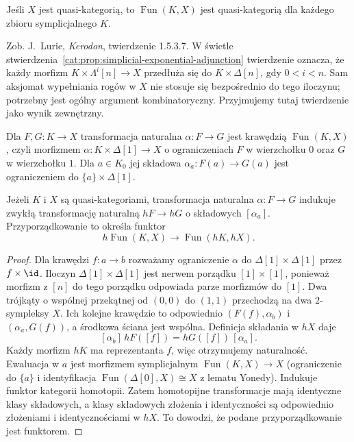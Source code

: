\begin{twierdzenie}\label{cat:thm:quasicat-functor-category}
Jeśli $X$ jest quasi-kategorią, to $\operatorname{Fun}(K,X)$ jest quasi-kategorią dla każdego zbioru symplicjalnego $K$.
\end{twierdzenie}
Zob. J.~Lurie, \emph{Kerodon}, twierdzenie 1.5.3.7. W świetle stwierdzenia~\ref{cat:prop:simplicial-exponential-adjunction} twierdzenie oznacza, że każdy morfizm $K\times\Lambda^i[n]\to X$ przedłuża się do $K\times\Delta[n]$, gdy $0<i<n$. Sam aksjomat wypełniania rogów w $X$ nie stosuje się bezpośrednio do tego iloczynu; potrzebny jest ogólny argument kombinatoryczny. Przyjmujemy tutaj twierdzenie jako wynik zewnętrzny.

\begin{definicja}\label{cat:def:quasicat-natural-transformation}
Dla $F,G:K\to X$ transformacja naturalna $\alpha:F\to G$ jest krawędzią $\operatorname{Fun}(K,X)$, czyli morfizmem $\alpha:K\times\Delta[1]\to X$ o ograniczeniach $F$ w wierzchołku $0$ oraz $G$ w wierzchołku $1$. Dla $a\in K_0$ jej składowa $\alpha_a:F(a)\to G(a)$ jest ograniczeniem do $\{a\}\times\Delta[1]$.
\end{definicja}

\begin{stwierdzenie}\label{cat:prop:quasicat-natural-h}
Jeżeli $K$ i $X$ są quasi-kategoriami, transformacja naturalna $\alpha:F\to G$ indukuje zwykłą transformację naturalną $hF\to hG$ o składowych $[\alpha_a]$. Przyporządkowanie to określa funktor
\[
 h\operatorname{Fun}(K,X)\longrightarrow
 \operatorname{Fun}(hK,hX).
\]
\end{stwierdzenie}
\begin{proof}
Dla krawędzi $f:a\to b$ rozważamy ograniczenie $\alpha$ do $\Delta[1]\times\Delta[1]$ przez $f\times\id$. Iloczyn $\Delta[1]\times\Delta[1]$ jest nerwem porządku $[1]\times[1]$, ponieważ morfizm z $[n]$ do tego porządku odpowiada parze morfizmów do $[1]$. Dwa trójkąty o wspólnej przekątnej od $(0,0)$ do $(1,1)$ przechodzą na dwa $2$-sympleksy $X$. Ich kolejne krawędzie to odpowiednio $(F(f),\alpha_b)$ i $(\alpha_a,G(f))$, a środkowa ściana jest wspólna. Definicja składania w $hX$ daje
\[
 [\alpha_b]\,hF([f])=hG([f])\,[\alpha_a].
\]
Każdy morfizm $hK$ ma reprezentanta $f$, więc otrzymujemy naturalność. Ewaluacja w $a$ jest morfizmem symplicjalnym $\operatorname{Fun}(K,X)\to X$ (ograniczenie do $\{a\}$ i identyfikacja $\operatorname{Fun}(\Delta[0],X)\cong X$ z lematu Yonedy). Indukuje funktor kategorii homotopii. Zatem homotopijne transformacje mają identyczne klasy składowych, a klasy składowych złożenia i identyczności są odpowiednio złożeniami i identycznościami w $hX$. To dowodzi, że podane przyporządkowanie jest funktorem.
\end{proof}


